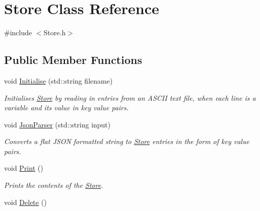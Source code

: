 \hypertarget{classStore}{\section{Store Class Reference}
\label{classStore}
}


{\ttfamily \#include $<$Store.\-h$>$}

\subsection*{Public Member Functions}
\begin{DoxyCompactItemize}
\item 
void \hyperlink{classStore_af5e0db5a37234365c4deb5bedd76693c}{Initialise} (std\-::string filename)
\begin{DoxyCompactList}\small\item\em Initialises \hyperlink{classStore}{Store} by reading in entries from an A\-S\-C\-I\-I text file, when each line is a variable and its value in key value pairs. \end{DoxyCompactList}\item 
void \hyperlink{classStore_adb84e3fb286cae07f64e8186b7ab04e1}{Json\-Parser} (std\-::string input)
\begin{DoxyCompactList}\small\item\em Converts a flat J\-S\-O\-N formatted string to \hyperlink{classStore}{Store} entries in the form of key value pairs. \end{DoxyCompactList}\item 
\hypertarget{classStore_a9d2f000bd849a9f5de71c3ba62dca340}{void \hyperlink{classStore_a9d2f000bd849a9f5de71c3ba62dca340}{Print} ()}\label{classStore_a9d2f000bd849a9f5de71c3ba62dca340}

\begin{DoxyCompactList}\small\item\em Prints the contents of the \hyperlink{classStore}{Store}. \end{DoxyCompactList}\item 
\hypertarget{classStore_a7fce0f8f3ec7978c5e7cd3d7053f899b}{void \hyperlink{classStore_a7fce0f8f3ec7978c5e7cd3d7053f899b}{Delete} ()}\label{classStore_a7fce0f8f3ec7978c5e7cd3d7053f899b}


\end{DoxyCompactItemize}
